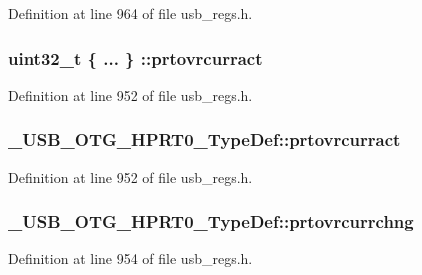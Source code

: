 Definition at line 964 of file usb\-\_\-regs.\-h.

\hypertarget{group___u_s_b___o_t_g___d_r_i_v_e_r_ga7023410d07d169ceb6ff075645457a5f}{
\subsubsection[{prtovrcurract}]{\setlength{\rightskip}{0pt plus 5cm}uint32\-\_\-t \{ ... \} \-::prtovrcurract}}\label{group___u_s_b___o_t_g___d_r_i_v_e_r_ga7023410d07d169ceb6ff075645457a5f}


Definition at line 952 of file usb\-\_\-regs.\-h.

\hypertarget{group___u_s_b___o_t_g___d_r_i_v_e_r_ga01b37bd5f68839474255967be14ae78c}{
\subsubsection[{prtovrcurract}]{ \-\_\-\-U\-S\-B\-\_\-\-O\-T\-G\-\_\-\-H\-P\-R\-T0\-\_\-\-Type\-Def\-::prtovrcurract}}\label{group___u_s_b___o_t_g___d_r_i_v_e_r_ga01b37bd5f68839474255967be14ae78c}


Definition at line 952 of file usb\-\_\-regs.\-h.

\hypertarget{group___u_s_b___o_t_g___d_r_i_v_e_r_ga02e861d33c684c8025cce67ce2ef59e8}{
\subsubsection[{prtovrcurrchng}]{ \-\_\-\-U\-S\-B\-\_\-\-O\-T\-G\-\_\-\-H\-P\-R\-T0\-\_\-\-Type\-Def\-::prtovrcurrchng}}\label{group___u_s_b___o_t_g___d_r_i_v_e_r_ga02e861d33c684c8025cce67ce2ef59e8}


Definition at line 954 of file usb\-\_\-regs.\-h.

